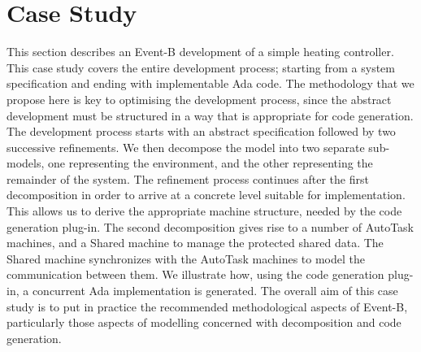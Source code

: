 \section{Case Study}\label{caseStudy}
This section describes an Event-B development of a simple heating controller. This case study covers the entire development process; starting from a system specification and ending with implementable Ada code. The methodology that we propose here is key to optimising the development process, since the abstract development must be structured in a way that is appropriate for code generation. The development process starts with an abstract specification followed by two successive refinements. We then decompose the model into two separate sub-models, one representing the environment, and the other representing the remainder of the system. The refinement process continues after the first decomposition in order to arrive at a concrete level suitable for implementation. This allows us to derive the appropriate machine structure, needed by the code generation plug-in. The second decomposition gives rise to a number of AutoTask machines, and a Shared machine to manage the protected shared data. The Shared machine synchronizes with the AutoTask machines to model the communication between them. We illustrate how, using the code generation plug-in, a concurrent Ada implementation is generated. The overall aim of this case study is to put in practice the recommended methodological aspects of Event-B, particularly those aspects of modelling concerned with decomposition and code generation.
